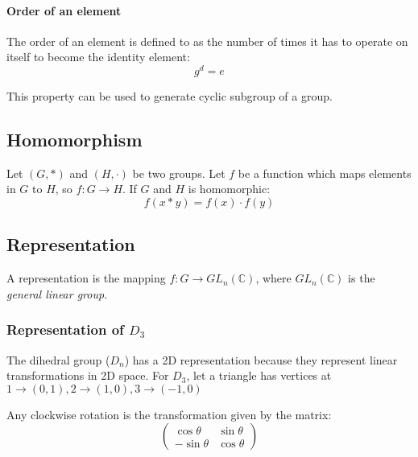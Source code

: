 \documentclass[12pt]{article}
\begin{document}
\paragraph{Order of an element}
The order of an element is defined to as the number of times it has to operate on itself to become the identity element:
\[ g^d = e\]

This property can be used to generate cyclic subgroup of a group.

\subsection{Homomorphism}

Let $(G,*)$ and $(H,\cdot)$ be two groups. Let $f$ be a function which maps elements in $G$ to $H$, so $f: G\to H$. If $G$ and $H$ is homomorphic:
\[ f(x*y) = f(x) \cdot f(y)\]

\subsection{Representation}
A representation is the mapping $f: G \to GL_n(\mathbb{C})$, where $GL_n(\mathbb{C})$ is the \textit{general linear group}.

\subsubsection{Representation of $D_3$}
The dihedral group ($D_n$) has a 2D representation because they represent linear transformations in 2D space. For $D_3$, let a triangle has vertices at $1\to (0,1), 2\to(1,0), 3\to(-1,0)$

Any clockwise rotation is the transformation given by the matrix:
\[
\begin{pmatrix}
\cos\theta & \sin\theta\\
-\sin\theta & \cos\theta
\end{pmatrix}
\]
\end{document}
